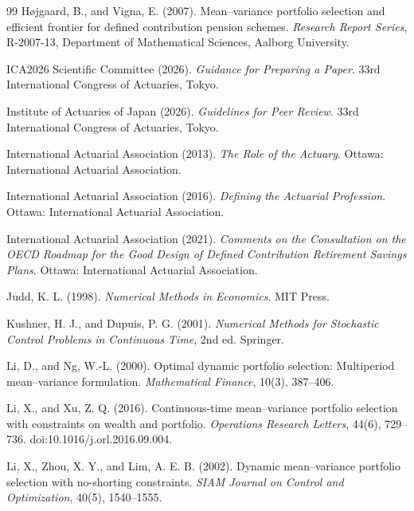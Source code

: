 \documentclass[10pt,a4paper]{article}
\theoremstyle{plain}
\theoremstyle{definition}
\begin{document}
\begin{thebibliography}{99}
H{\o}jgaard, B., and Vigna, E. (2007).
Mean--variance portfolio selection and efficient frontier for defined contribution pension schemes.
\emph{Research Report Series}, R-2007-13, Department of Mathematical Sciences, Aalborg University.

ICA2026 Scientific Committee (2026).
\emph{Guidance for Preparing a Paper}.
33rd International Congress of Actuaries, Tokyo.

Institute of Actuaries of Japan (2026).
\emph{Guidelines for Peer Review}.
33rd International Congress of Actuaries, Tokyo.

International Actuarial Association (2013).
\emph{The Role of the Actuary}.
Ottawa: International Actuarial Association.

International Actuarial Association (2016).
\emph{Defining the Actuarial Profession}.
Ottawa: International Actuarial Association.

International Actuarial Association (2021).
\emph{Comments on the Consultation on the OECD Roadmap for the Good Design of Defined Contribution Retirement Savings Plans}.
Ottawa: International Actuarial Association.

Judd, K. L. (1998).
\emph{Numerical Methods in Economics}.
MIT Press.

Kushner, H. J., and Dupuis, P. G. (2001).
\emph{Numerical Methods for Stochastic Control Problems in Continuous Time}, 2nd ed.
Springer.

Li, D., and Ng, W.-L. (2000).
Optimal dynamic portfolio selection: Multiperiod mean--variance formulation.
\emph{Mathematical Finance}, 10(3), 387--406.

Li, X., and Xu, Z. Q. (2016).
Continuous-time mean--variance portfolio selection with constraints on wealth and portfolio.
\emph{Operations Research Letters}, 44(6), 729--736.
doi:10.1016/j.orl.2016.09.004.

Li, X., Zhou, X. Y., and Lim, A. E. B. (2002).
Dynamic mean--variance portfolio selection with no-shorting constraints.
\emph{SIAM Journal on Control and Optimization}, 40(5), 1540--1555.


\end{thebibliography}
\end{document}
